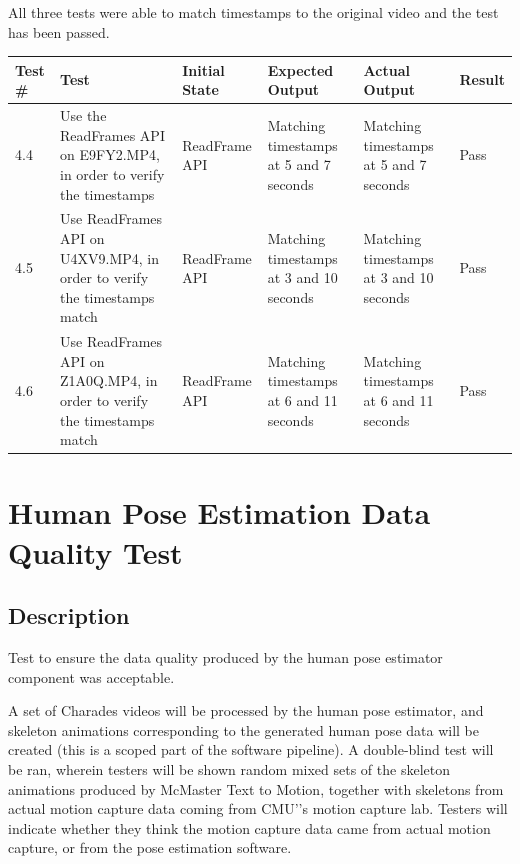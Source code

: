 \documentclass{scrreprt}
\begin{document}
All three tests were able to match timestamps to the original video and the test has been passed.

\begin{table}[H]
        \centering
        \begin{tabular}[t]{||p{0.75cm}|p{4cm}|p{2.5cm}|p{3cm}|p{2.5cm}|p{1cm}||}
                \hline
                \textbf Test \# & \textbf Test & \textbf Initial State & \textbf Expected Output & \textbf Actual Output & \textbf Result\\
                \hline\hline
                4.4 & Use the ReadFrames API on E9FY2.MP4, in order to verify the timestamps & ReadFrame API & Matching timestamps at 5 and 7 seconds & Matching timestamps at 5 and 7 seconds & Pass\\
                \hline
                4.5 & Use ReadFrames API on U4XV9.MP4, in order to verify the timestamps match & ReadFrame API & Matching timestamps at 3 and 10 seconds & Matching timestamps at 3 and 10 seconds & Pass\\
                \hline
                4.6 & Use ReadFrames API on Z1A0Q.MP4, in order to verify the timestamps match & ReadFrame API & Matching timestamps at 6 and 11 seconds & Matching timestamps at 6 and 11 seconds  & Pass\\
                \hline
        \end{tabular}
\end{table}

\section{Human Pose Estimation Data Quality Test}
\subsection{Description}

Test to ensure the data quality produced by the human pose estimator component
was acceptable.

A set of Charades videos will be processed by the human pose estimator, and
skeleton animations corresponding to the generated human pose data will be
created (this is a scoped part of the software pipeline). A double-blind test
will be ran, wherein testers will be shown random mixed sets of the skeleton
animations produced by McMaster Text to Motion, together with skeletons from
actual motion capture data coming from CMU'’s motion capture lab. Testers will
indicate whether they think the motion capture data came from actual motion
capture, or from the pose estimation software.
\end{document}
